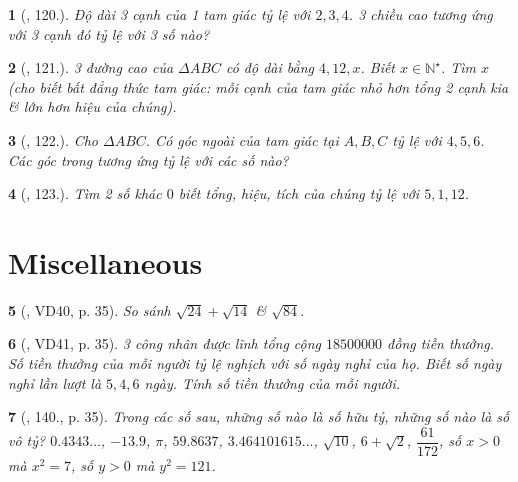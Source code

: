 \documentclass{article}
\newtheorem{baitoan}{}
\begin{document}
\begin{baitoan}[\cite{Binh_Toan_7_tap_1}, 120.]
	Độ dài 3 cạnh của 1 tam giác tỷ lệ với $2,3,4$. 3 chiều cao tương ứng với 3 cạnh đó tỷ lệ với 3 số nào?
\end{baitoan}

\begin{baitoan}[\cite{Binh_Toan_7_tap_1}, 121.]
	3 đường cao của $\Delta ABC$ có độ dài bằng $4,12,x$. Biết $x\in\mathbb{N}^\star$. Tìm $x$ (cho biết {\rm bất đẳng thức tam giác}: mỗi cạnh của tam giác nhỏ hơn tổng 2 cạnh kia \& lớn hơn hiệu của chúng).
\end{baitoan}

\begin{baitoan}[\cite{Binh_Toan_7_tap_1}, 122.]
	Cho $\Delta ABC$. Có góc ngoài của tam giác tại $A,B,C$ tỷ lệ với $4,5,6$. Các góc trong tương ứng tỷ lệ với các số nào?
\end{baitoan}

\begin{baitoan}[\cite{Binh_Toan_7_tap_1}, 123.]
	Tìm 2 số khác $0$ biết tổng, hiệu, tích của chúng tỷ lệ với $5,1,12$.
\end{baitoan}


\section{Miscellaneous}

\begin{baitoan}[\cite{Tuyen_Toan_7}, VD40, p. 35]
	So sánh $\sqrt{24} + \sqrt{14}$ \& $\sqrt{84}$.
\end{baitoan}

\begin{baitoan}[\cite{Tuyen_Toan_7}, VD41, p. 35]
	3 công nhân được lĩnh tổng cộng $18 500 000$ đồng tiền thưởng. Số tiền thưởng của mỗi người tỷ lệ nghịch với số ngày nghỉ của họ. Biết số ngày nghỉ lần lượt là $5,4,6$ ngày. Tính số tiền thưởng của mỗi người.
\end{baitoan}

\begin{baitoan}[\cite{Tuyen_Toan_7}, 140., p. 35]
	Trong các số sau, những số nào là số hữu tỷ, những số nào là số vô tỷ? $0.4343\ldots$, $-13.9$, $\pi$, $59.8637$, $3.464101615\ldots$, $\sqrt{10}$, $6 + \sqrt{2}$, $\dfrac{61}{172}$, số $x > 0$ mà $x^2 = 7$, số $y > 0$ mà $y^2 = 121$.
\end{baitoan}
\end{document}
